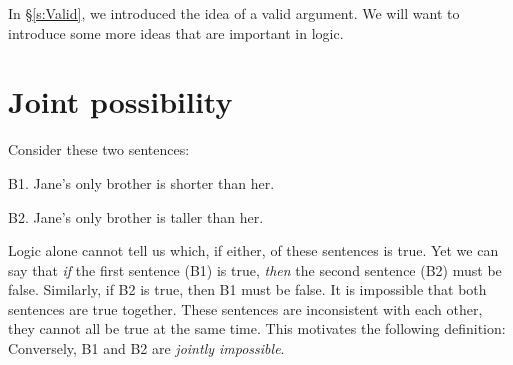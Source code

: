 In \S\ref{s:Valid}, we introduced the idea of a valid argument. We will want to introduce some more ideas that are important in logic.



\section{Joint possibility}

Consider these two sentences:
	\begin{ebullet}
		\item[B1.] Jane's only brother is shorter than her.
		\item[B2.] Jane's only brother is taller than her.
	\end{ebullet}
Logic alone cannot tell us which, if either, of these sentences is true. Yet we can say that \emph{if} the first sentence (B1) is true, \emph{then} the second sentence (B2) must be false. Similarly, if B2 is true, then B1 must be false. It is impossible that both sentences are true together. These sentences are inconsistent with each other, they cannot all be true at the same time. This motivates the following definition:
Conversely, B1 and B2 are \emph{jointly impossible}.

